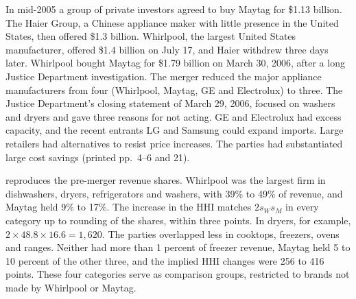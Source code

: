  In mid-2005 a group of private investors agreed to buy Maytag for \$1.13 billion. The Haier
Group, a Chinese appliance maker with little presence in the United States, then offered \$1.3 billion. Whirlpool,
the largest United States manufacturer, offered \$1.4 billion on July 17, and Haier withdrew three days later.
Whirlpool bought Maytag for \$1.79 billion on March 30, 2006, after a long Justice Department investigation. The
merger reduced the major appliance manufacturers from four (Whirlpool, Maytag, GE and Electrolux) to three. The
Justice Department's closing statement of March 29, 2006, focused on washers and dryers and gave three reasons for
not acting. GE and Electrolux had excess capacity, and the recent entrants LG and Samsung could expand imports.
Large retailers had alternatives to resist price increases. The parties had substantiated large cost savings
(printed pp.~4--6 and 21).

  reproduces the pre-merger revenue shares. Whirlpool was the
largest firm in dishwashers, dryers, refrigerators and washers, with 39\% to 49\% of revenue, and Maytag held 9\%
to 17\%. The increase in the HHI matches $2s_Ws_M$ in every category up to rounding of the
shares, within three points. In dryers, for example, $2\times48.8\times16.6=1{,}620$. The parties overlapped less in
cooktops, freezers, ovens and ranges. Neither had more than 1 percent of freezer revenue, Maytag held 5 to 10 percent
of the other three, and the implied HHI changes were 256 to 416 points.
These four categories serve as comparison groups, restricted to brands not made by Whirlpool or Maytag.

